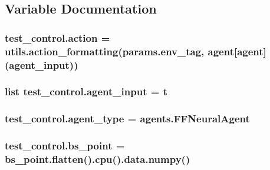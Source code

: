 \subsection{Variable Documentation}
\subsubsection[{\texorpdfstring{action}{action}}]{\setlength{\rightskip}{0pt plus 5cm}test\+\_\+control.\+action = utils.\+action\+\_\+formatting(params.\+env\+\_\+tag, agent\mbox{[}\textquotesingle{}agent\textquotesingle{}\mbox{]}({\bf agent\+\_\+input}))}\hypertarget{namespacetest__control_afecd4367e5ef160ad3f6556a535290a9}{}\label{namespacetest__control_afecd4367e5ef160ad3f6556a535290a9}
\subsubsection[{\texorpdfstring{agent\+\_\+input}{agent_input}}]{\setlength{\rightskip}{0pt plus 5cm}list test\+\_\+control.\+agent\+\_\+input = {\bf t}}\hypertarget{namespacetest__control_aaa65dc5dc7921eddbe0be1c153c89872}{}\label{namespacetest__control_aaa65dc5dc7921eddbe0be1c153c89872}
\subsubsection[{\texorpdfstring{agent\+\_\+type}{agent_type}}]{\setlength{\rightskip}{0pt plus 5cm}test\+\_\+control.\+agent\+\_\+type = agents.\+F\+F\+Neural\+Agent}\hypertarget{namespacetest__control_aa591252ece9facc4ba1f1f7a66fbd939}{}\label{namespacetest__control_aa591252ece9facc4ba1f1f7a66fbd939}
\subsubsection[{\texorpdfstring{bs\+\_\+point}{bs_point}}]{\setlength{\rightskip}{0pt plus 5cm}test\+\_\+control.\+bs\+\_\+point = bs\+\_\+point.\+flatten().cpu().data.\+numpy()}\hypertarget{namespacetest__control_a0e5fe494ac8929ac9bd895b84b5b25c8}{}\label{namespacetest__control_a0e5fe494ac8929ac9bd895b84b5b25c8}
